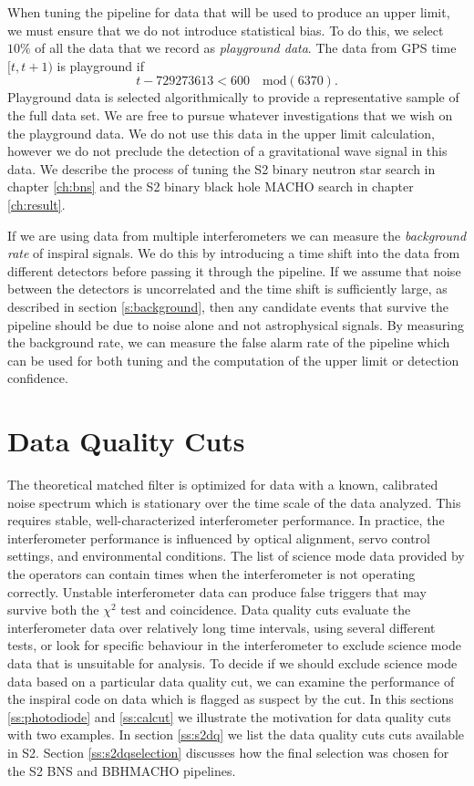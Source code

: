 When tuning the pipeline for data that will be used to produce an upper limit,
we must ensure that we do not introduce statistical bias. To do this, we
select $10\%$ of all the data that we record as \emph{playground data}. The
data from GPS time $[t,t+1)$ is playground if 
\begin{equation}
t - 729273613 < 600 \quad \mathrm{mod}(6370).
\end{equation}
Playground data is selected algorithmically to provide a representative sample
of the full data set. We are free to pursue whatever investigations that we
wish on the playground data. We do not use this data in the upper limit
calculation, however we do not preclude the detection of a gravitational wave
signal in this data. We describe the process of tuning the S2 binary neutron
star search in chapter \ref{ch:bns} and the S2 binary black hole MACHO search
in chapter \ref{ch:result}.

If we are using data from multiple interferometers we can measure the
\emph{background rate} of inspiral signals. We do this by introducing a time
shift into the data from different detectors before passing it through the
pipeline. If we assume that noise between the detectors is uncorrelated and
the time shift is sufficiently large, as described in section
\ref{s:background}, then any candidate events that survive the pipeline should
be due to noise alone and not astrophysical signals. By measuring the
background rate, we can measure the false alarm rate of the pipeline which can
be used for both tuning and the computation of the upper limit or detection
confidence.

\section{Data Quality Cuts}
\label{s:dq}

The theoretical matched filter is optimized for data with a known, calibrated
noise spectrum which is stationary over the time scale of the data analyzed.
This requires stable, well-characterized interferometer performance. In practice,
the interferometer performance is influenced by optical alignment, servo
control settings, and environmental conditions. The list of science mode data
provided by the operators can contain times when the interferometer is not
operating correctly. Unstable interferometer data can produce false triggers
that may survive both the $\chi^2$ test and coincidence.  Data quality cuts
evaluate the interferometer data over relatively long time intervals, using
several different tests, or look for specific behaviour in the interferometer
to exclude science mode data that is unsuitable for analysis.  To decide if we
should exclude science mode data based on a particular data quality cut, we
can examine the performance of the inspiral code on data which is flagged as
suspect by the cut. In this sections \ref{ss:photodiode} and \ref{ss:calcut}
we illustrate the motivation for data quality cuts with two examples. In
section \ref{ss:s2dq} we list the data quality cuts cuts available in S2.
Section \ref{ss:s2dqselection} discusses how the final selection was chosen for
the S2 BNS and BBHMACHO pipelines.

